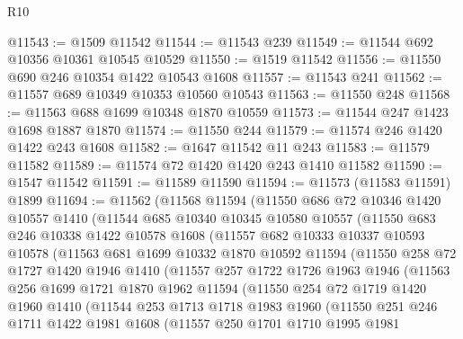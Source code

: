 \begin{lexlean}{R10}
\begin{coremodule}
@11543 := @1509 @11542
@11544 := @11543 @239
@11549 := @11544 @692 @10356 @10361 @10545 @10529
@11550 := @1519 @11542
@11556 := @11550 @690 @246 @10354 @1422 @10543 @1608
@11557 := @11543 @241
@11562 := @11557 @689 @10349 @10353 @10560 @10543
@11563 := @11550 @248
@11568 := @11563 @688 @1699 @10348 @1870 @10559
@11573 := @11544 @247 @1423 @1698 @1887 @1870
@11574 := @11550 @244
@11579 := @11574 @246 @1420 @1422 @243 @1608
@11582 := @1647 @11542 @11 @243
@11583 := @11579 @11582
@11589 := @11574 @72 @1420 @1420 @243 @1410 @11582
@11590 := @1547 @11542
@11591 := @11589 @11590
@11594 := @11573 (@11583 @11591) @1899
@11694 := @11562
    (@11568
      @11594
      (@11550
        @686
        @72
        @10346
        @1420
        @10557
        @1410
        (@11544
          @685
          @10340
          @10345
          @10580
          @10557
          (@11550
            @683
            @246
            @10338
            @1422
            @10578
            @1608
            (@11557
              @682
              @10333
              @10337
              @10593
              @10578
              (@11563
                @681
                @1699
                @10332
                @1870
                @10592
                @11594
                (@11550
                  @258
                  @72
                  @1727
                  @1420
                  @1946
                  @1410
                  (@11557
                    @257
                    @1722
                    @1726
                    @1963
                    @1946
                    (@11563
                      @256
                      @1699
                      @1721
                      @1870
                      @1962
                      @11594
                      (@11550
                        @254
                        @72
                        @1719
                        @1420
                        @1960
                        @1410
                        (@11544
                          @253
                          @1713
                          @1718
                          @1983
                          @1960
                          (@11550
                            @251
                            @246
                            @1711
                            @1422
                            @1981
                            @1608
                            (@11557
                              @250
                              @1701
                              @1710
                              @1995
                              @1981

\end{coremodule}
\end{lexlean}
